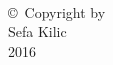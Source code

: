 
\thispagestyle{empty}
\hbox{\ }

\vfill
\renewcommand{\baselinestretch}{1}
\small\normalsize

\vspace{-.65in}

\begin{center}
\large{\copyright \hbox{ }Copyright by\\
Sefa Kilic  %
\\
2016}
\end{center}

\vfill
